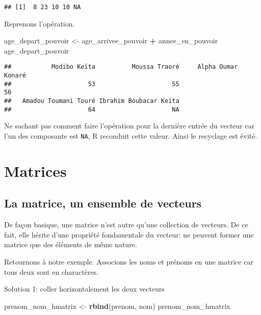 \documentclass[]{book}
\newenvironment{Shaded}{\begin{snugshade}}{\end{snugshade}}
\newcommand{\KeywordTok}[1]{\textcolor[rgb]{0.13,0.29,0.53}{\textbf{#1}}}
\newcommand{\StringTok}[1]{\textcolor[rgb]{0.31,0.60,0.02}{#1}}
\newcommand{\OperatorTok}[1]{\textcolor[rgb]{0.81,0.36,0.00}{\textbf{#1}}}
\newcommand{\NormalTok}[1]{#1}
\begin{document}
\begin{verbatim}
## [1]  8 23 10 10 NA
\end{verbatim}

Reprenons l'opération.

\begin{Shaded}
\begin{Highlighting}[]
\NormalTok{age_depart_pouvoir <-}\StringTok{ }\NormalTok{age_arrivee_pouvoir }\OperatorTok{+}\StringTok{ }\NormalTok{annee_en_pouvoir}
\NormalTok{age_depart_pouvoir}
\end{Highlighting}
\end{Shaded}

\begin{verbatim}
##           Modibo Keïta          Moussa Traoré     Alpha Oumar Konaré 
##                     53                     55                     56 
##   Amadou Toumani Touré Ibrahim Boubacar Keïta 
##                     64                     NA
\end{verbatim}

Ne sachant pas comment faire l'opération pour la dernière entrée du
vecteur car l'un des composante est \texttt{NA}, R reconduit cette
valeur. Ainsi le recyclage est évité.

\section{Matrices}\label{matrices}

\subsection{La matrice, un ensemble de
vecteurs}\label{la-matrice-un-ensemble-de-vecteurs}

De façon basique, une matrice n'est autre qu'une collection de vecteurs.
De ce fait, elle hérite d'une propriété fondamentale du vecteur: ne
peuvent former une matrice que des éléments de même nature.

Retournons à notre exemple. Associons les noms et prénoms en une matrice
car tous deux sont en charactères.

Solution 1: coller horizontalement les deux vecteurs

\begin{Shaded}
\begin{Highlighting}[]
\NormalTok{prenom_nom_hmatrix <-}\StringTok{ }\KeywordTok{rbind}\NormalTok{(prenom, nom)}
\NormalTok{prenom_nom_hmatrix}
\end{Highlighting}
\end{Shaded}
\end{document}
